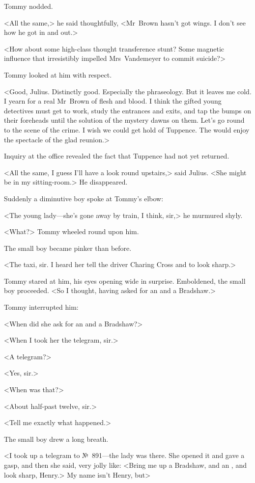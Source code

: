 Tommy nodded.

<All the same,> he said thoughtfully, <Mr~Brown hasn't got wings. I don't see how he got in and out.>

<How about some high-class thought transference stunt? Some magnetic influence that irresistibly impelled Mrs~Vandemeyer to commit suicide?>

Tommy looked at him with respect.

<Good, Julius. Distinctly good. Especially the phraseology. But it leaves me cold. I yearn for a real Mr~Brown of flesh and blood. I think the gifted young detectives must get to work, study the entrances and exits, and tap the bumps on their foreheads until the solution of the mystery dawns on them. Let's go round to the scene of the crime. I wish we could get hold of Tuppence. The  would enjoy the spectacle of the glad reunion.>

Inquiry at the office revealed the fact that Tuppence had not yet returned.

<All the same, I guess I'll have a look round upstairs,> said Julius. <She might be in my sitting-room.> He disappeared.

Suddenly a diminutive boy spoke at Tommy's elbow:

<The young lady—she's gone away by train, I think, sir,> he murmured shyly.

<What?> Tommy wheeled round upon him.

The small boy became pinker than before.

<The taxi, sir. I heard her tell the driver Charing Cross and to look sharp.>

Tommy stared at him, his eyes opening wide in surprise. Emboldened, the small boy proceeded. <So I thought, having asked for an  and a Bradshaw.>

Tommy interrupted him:

<When did she ask for an  and a Bradshaw?>

<When I took her the telegram, sir.>

<A telegram?>

<Yes, sir.>

<When was that?>

<About half-past twelve, sir.>

<Tell me exactly what happened.>

The small boy drew a long breath.

<I took up a telegram to №~891—the lady was there. She opened it and gave a gasp, and then she said, very jolly like: <Bring me up a Bradshaw, and an , and look sharp, Henry.> My name isn't Henry, but\longdash>

